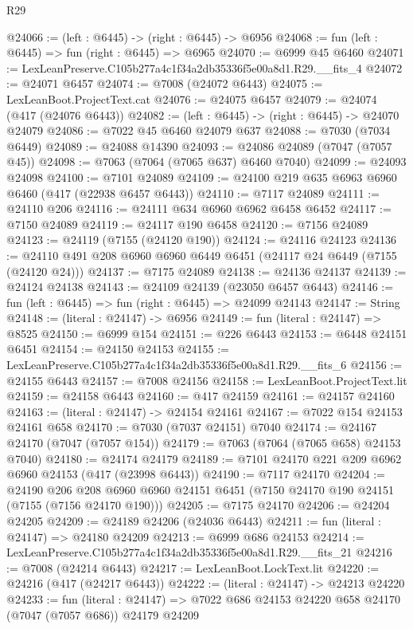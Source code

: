 \begin{lexlean}{R29}
\begin{coremodule}
@24066 := (left : @6445) -> (right : @6445) -> @6956
@24068 := fun (left : @6445) => fun (right : @6445) => @6965
@24070 := @6999 @45 @6460
@24071 := LexLeanPreserve.C105b277a4c1f34a2db35336f5e00a8d1.R29.__fits_4
@24072 := @24071 @6457
@24074 := @7008 (@24072 @6443)
@24075 := LexLeanBoot.ProjectText.cat
@24076 := @24075 @6457
@24079 := @24074 (@417 (@24076 @6443))
@24082 := (left : @6445) -> (right : @6445) -> @24070 @24079
@24086 := @7022 @45 @6460 @24079 @637
@24088 := @7030 (@7034 @6449)
@24089 := @24088 @14390
@24093 := @24086 @24089 (@7047 (@7057 @45))
@24098 := @7063 (@7064 (@7065 @637) @6460 @7040)
@24099 := @24093 @24098
@24100 := @7101 @24089
@24109 := @24100 @219 @635 @6963 @6960 @6460 (@417 (@22938 @6457 @6443))
@24110 := @7117 @24089
@24111 := @24110 @206
@24116 := @24111 @634 @6960 @6962 @6458 @6452
@24117 := @7150 @24089
@24119 := @24117 @190 @6458
@24120 := @7156 @24089
@24123 := @24119 (@7155 (@24120 @190))
@24124 := @24116 @24123
@24136 := @24110 @491 @208 @6960 @6960 @6449 @6451 (@24117 @24 @6449 (@7155 (@24120 @24)))
@24137 := @7175 @24089
@24138 := @24136 @24137
@24139 := @24124 @24138
@24143 := @24109 @24139 (@23050 @6457 @6443)
@24146 := fun (left : @6445) => fun (right : @6445) => @24099 @24143
@24147 := String
@24148 := (literal : @24147) -> @6956
@24149 := fun (literal : @24147) => @8525
@24150 := @6999 @154
@24151 := @226 @6443
@24153 := @6448 @24151 @6451
@24154 := @24150 @24153
@24155 := LexLeanPreserve.C105b277a4c1f34a2db35336f5e00a8d1.R29.__fits_6
@24156 := @24155 @6443
@24157 := @7008 @24156
@24158 := LexLeanBoot.ProjectText.lit
@24159 := @24158 @6443
@24160 := @417 @24159
@24161 := @24157 @24160
@24163 := (literal : @24147) -> @24154 @24161
@24167 := @7022 @154 @24153 @24161 @658
@24170 := @7030 (@7037 @24151) @7040
@24174 := @24167 @24170 (@7047 (@7057 @154))
@24179 := @7063 (@7064 (@7065 @658) @24153 @7040)
@24180 := @24174 @24179
@24189 := @7101 @24170 @221 @209 @6962 @6960 @24153 (@417 (@23998 @6443))
@24190 := @7117 @24170
@24204 := @24190
    @206
    @208
    @6960
    @6960
    @24151
    @6451
    (@7150 @24170 @190 @24151 (@7155 (@7156 @24170 @190)))
@24205 := @7175 @24170
@24206 := @24204 @24205
@24209 := @24189 @24206 (@24036 @6443)
@24211 := fun (literal : @24147) => @24180 @24209
@24213 := @6999 @686 @24153
@24214 := LexLeanPreserve.C105b277a4c1f34a2db35336f5e00a8d1.R29.__fits_21
@24216 := @7008 (@24214 @6443)
@24217 := LexLeanBoot.LockText.lit
@24220 := @24216 (@417 (@24217 @6443))
@24222 := (literal : @24147) -> @24213 @24220
@24233 := fun (literal : @24147) =>
  @7022 @686 @24153 @24220 @658 @24170 (@7047 (@7057 @686)) @24179 @24209

\end{coremodule}
\end{lexlean}
